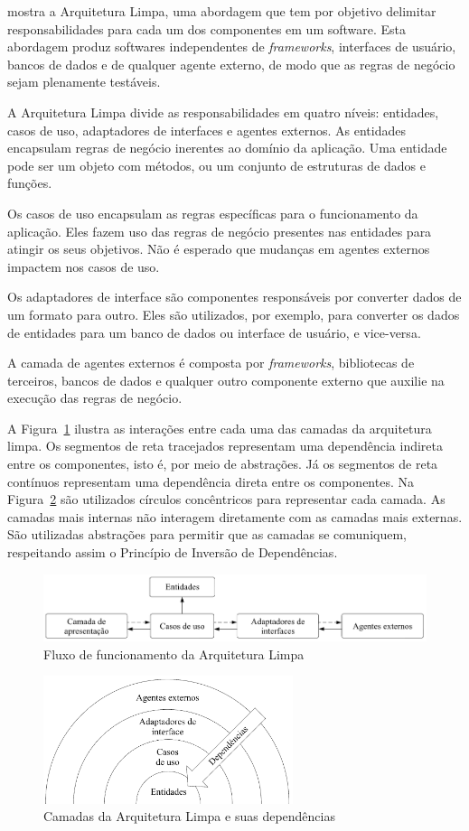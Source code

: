 \cite{clean-arch-book} mostra a Arquitetura Limpa, uma abordagem que tem por objetivo delimitar responsabilidades para cada um dos componentes em um software.
Esta abordagem produz softwares independentes de \emph{frameworks}, interfaces de usuário, bancos de dados e de qualquer agente externo, de modo que as regras de negócio sejam plenamente testáveis.

A Arquitetura Limpa divide as responsabilidades em quatro níveis: entidades, casos de uso, adaptadores de interfaces e agentes externos.
As entidades encapsulam regras de negócio inerentes ao domínio da aplicação.
Uma entidade pode ser um objeto com métodos, ou um conjunto de estruturas de dados e funções.

Os casos de uso encapsulam as regras específicas para o funcionamento da aplicação.
Eles fazem uso das regras de negócio presentes nas entidades para atingir os seus objetivos.
Não é esperado que mudanças em agentes externos impactem nos casos de uso.

Os adaptadores de interface são componentes responsáveis por converter dados de um formato para outro.
Eles são utilizados, por exemplo, para converter os dados de entidades para um banco de dados ou interface de usuário, e vice-versa.

A camada de agentes externos é composta por \emph{frameworks}, bibliotecas de terceiros, bancos de dados e qualquer outro componente externo que auxilie na execução das regras de negócio.

A Figura~\ref{fig:clean_arch} ilustra as interações entre cada uma das camadas da arquitetura limpa.
Os segmentos de reta tracejados representam uma dependência indireta entre os componentes, isto é, por meio de abstrações.
Já os segmentos de reta contínuos representam uma dependência direta entre os componentes.
Na Figura~\ref{fig:clean_arch_circles} são utilizados círculos concêntricos para representar cada camada.
As camadas mais internas não interagem diretamente com as camadas mais externas.
São utilizadas abstrações para permitir que as camadas se comuniquem, respeitando assim o Princípio de Inversão de Dependências.
\begin{figure}[ht]
	\centering
	\includegraphics[width=1\textwidth]{images/clean_arch.png}
	\caption{Fluxo de funcionamento da Arquitetura Limpa}
	\label{fig:clean_arch}
\end{figure}

\begin{figure}[ht]
	\centering
	\includegraphics[width=0.65\textwidth]{images/clean_arch_circles.png}
	\caption{Camadas da Arquitetura Limpa e suas dependências}
	\label{fig:clean_arch_circles}
\end{figure}
